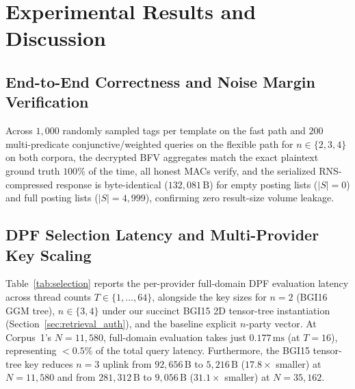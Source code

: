 \documentclass[11pt,a4paper]{article}
\begin{document}
\section{Experimental Results and Discussion}\label{sec:eval}

\subsection{End-to-End Correctness and Noise Margin Verification}
Across $1{,}000$ randomly sampled tags per template on the fast path and $200$ multi-predicate conjunctive/weighted queries on the flexible path for $n \in \{2, 3, 4\}$ on both corpora, the decrypted BFV aggregates match the exact plaintext ground truth $100\%$ of the time, all honest MACs verify, and the serialized RNS-compressed response is byte-identical ($132{,}081\,\text{B}$) for empty posting lists ($|S| = 0$) and full posting lists ($|S| = 4{,}999$), confirming zero result-size volume leakage.

\subsection{DPF Selection Latency and Multi-Provider Key Scaling}
Table~\ref{tab:selection} reports the per-provider full-domain DPF evaluation latency across thread counts $T \in \{1, \dots, 64\}$, alongside the key sizes for $n=2$ (BGI16 GGM tree), $n \in \{3, 4\}$ under our succinct BGI15 2D tensor-tree instantiation (Section~\ref{sec:retrieval_auth}), and the baseline explicit $n$-party vector. At Corpus~1's $N = 11{,}580$, full-domain evaluation takes just $0.177\,\text{ms}$ (at $T=16$), representing $< 0.5\%$ of the total query latency. Furthermore, the BGI15 tensor-tree key reduces $n=3$ uplink from $92{,}656\,\text{B}$ to $5{,}216\,\text{B}$ ($17.8\times$ smaller) at $N=11{,}580$ and from $281{,}312\,\text{B}$ to $9{,}056\,\text{B}$ ($31.1\times$ smaller) at $N=35{,}162$.
\end{document}
